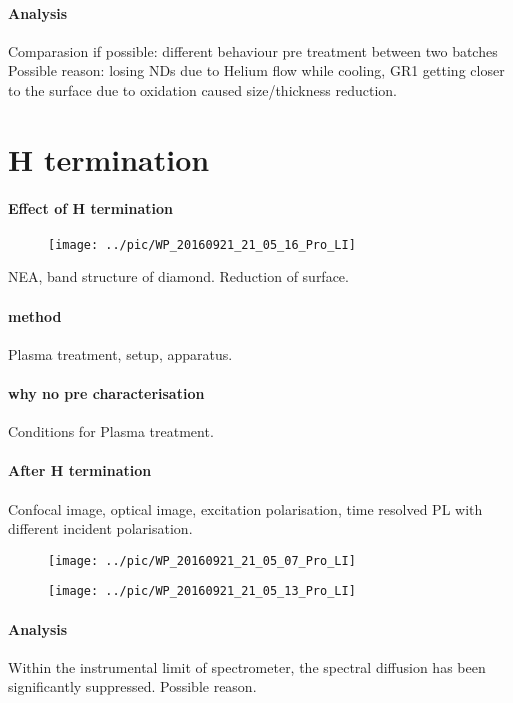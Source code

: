 \paragraph{Analysis} 
Comparasion if possible: different behaviour pre treatment between two batches
Possible reason: losing NDs due to Helium flow while cooling, GR1 getting closer to the surface due to oxidation caused size/thickness reduction.


\section[H termination]{H termination}
\paragraph{Effect of H termination}
\begin{figure}[h]
\centering
\texttt{[image: ../pic/WP\_20160921\_21\_05\_16\_Pro\_LI]}
\caption{}
\label{fig:wp20160921210516proli}
\end{figure}

NEA, band structure of diamond. Reduction of surface.
\paragraph{method} Plasma treatment, setup, apparatus.

\paragraph{why no pre characterisation} Conditions for Plasma treatment.

\paragraph{After H termination} Confocal image, optical image, excitation polarisation, time resolved PL with different incident polarisation.
\begin{figure}[h]
\centering
\texttt{[image: ../pic/WP\_20160921\_21\_05\_07\_Pro\_LI]}
\caption{}
\label{fig:wp20160921210507proli}
\end{figure}
\begin{figure}[h]
\centering
\texttt{[image: ../pic/WP\_20160921\_21\_05\_13\_Pro\_LI]}
\caption{}
\label{fig:wp20160921210513proli}
\end{figure}

\paragraph{Analysis} Within the instrumental limit of spectrometer, the spectral diffusion has been significantly suppressed. Possible reason.